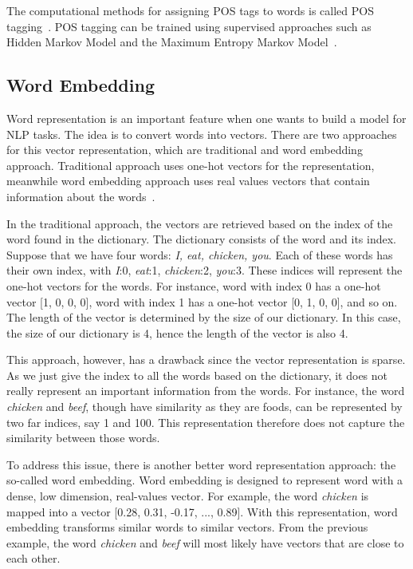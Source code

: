 The computational methods for assigning POS tags to words is called POS tagging~\citep{jurafsky2016speech}. POS tagging can be trained using supervised approaches such as Hidden Markov Model and the Maximum Entropy Markov Model~\citep{jurafsky2016speech}.
 

\subsection{Word Embedding}
Word representation is an important feature when one wants to build a model for NLP tasks. The idea is to convert words into vectors. There are two approaches for this vector representation, which are traditional and word embedding approach. Traditional approach uses one-hot vectors for the representation, meanwhile word embedding approach uses real values vectors that contain information about the words~\citep{mikolov2013efficient}.

In the traditional approach, the vectors are retrieved based on the index of the word found in the dictionary. The dictionary consists of the word and its index. Suppose that we have four words: \textit{I, eat, chicken, you}. Each of these words has their own index, with \textit{I}:0, \textit{eat}:1, \textit{chicken}:2, \textit{you}:3. These indices will represent the one-hot vectors for the words. For instance, word with index 0 has a one-hot vector [1, 0, 0, 0], word with index 1 has a one-hot vector [0, 1, 0, 0], and so on. The length of the vector is determined by the size of our dictionary. In this case, the size of our dictionary is 4, hence the length of the vector is also 4. 

This approach, however, has a drawback since the vector representation is sparse. As we just give the index to all the words based on the dictionary, it does not really represent an important information from the words. For instance, the word \textit{chicken} and \textit{beef}, though have similarity as they are foods, can be represented by two far indices, say 1 and 100. This representation therefore does not capture the similarity between those words. 

To address this issue, there is another better word representation approach: the so-called word embedding. Word embedding is designed to represent word with a dense, low dimension, real-values vector. For example, the word \textit{chicken} is mapped into a vector [0.28, 0.31, -0.17, ..., 0.89]. With this representation, word embedding transforms similar words to similar vectors. From the previous example, the word \textit{chicken} and \textit{beef} will most likely have vectors that are close to each other.

